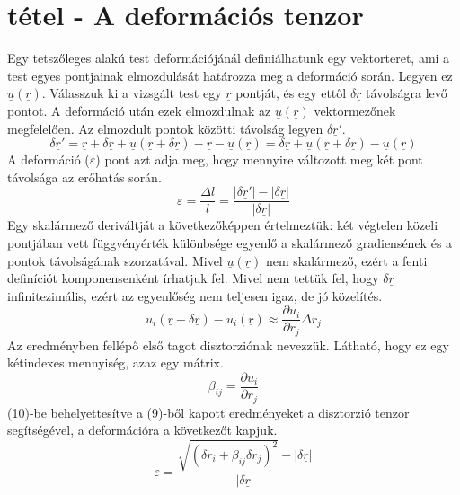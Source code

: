 \documentclass[a4paper,12pt]{article}
\begin{document}
\section{tétel - A deformációs tenzor}
Egy tetszőleges alakú test deformációjánál definiálhatunk egy vektorteret, ami a test egyes pontjainak elmozdulását határozza meg a deformáció során. Legyen ez $\underline{u}(\underline{r})$. Válasszuk ki a vizsgált test egy $\underline{r}$ pontját, és egy ettől $\delta\underline{r}$ távolságra levő pontot. A deformáció után ezek elmozdulnak az $\underline{u}(\underline{r})$ vektormezőnek megfelelően. Az elmozdult pontok közötti távolság legyen $\delta \underline{r}'$.
\begin{equation}
\delta \underline{r}'=\underline{r}+\delta\underline{r}+\underline{u}(\underline{r}+\delta\underline{r})-\underline{r}-\underline{u}(\underline{r})=\delta\underline{r}+\underline{u}(\underline{r}+\delta\underline{r})-\underline{u}(\underline{r})
\end{equation}
A deformáció ($\varepsilon$) pont azt adja meg, hogy mennyire változott meg két pont távolsága az erőhatás során.
\begin{equation}
\varepsilon=\frac{\Delta l}{l}=\frac{|\delta\underline{r}'|-|\delta\underline{r}|}{|\delta\underline{r}|}
\end{equation}
Egy skalármező deriváltját a következőképpen értelmeztük: két végtelen közeli pontjában vett függvényérték különbsége egyenlő a skalármező gradiensének és a pontok távolságának szorzatával. Mivel $\underline{u}(\underline{r})$ nem skalármező, ezért a fenti definíciót komponensenként írhatjuk fel. Mivel nem tettük fel, hogy $\delta\underline{r}$ infinitezimális, ezért az egyenlőség nem teljesen igaz, de jó közelítés.
\begin{equation}
u_i(\underline{r}+\delta\underline{r})-u_i(\underline{r})\approx\frac{\partial u_i}{\partial r_j}\Delta r_j
\end{equation}
Az eredményben fellépő első tagot disztorziónak nevezzük. Látható, hogy ez egy kétindexes mennyiség, azaz egy mátrix.
\begin{equation}
\beta_{ij}=\frac{\partial u_i}{\partial r_j}
\end{equation}
(10)-be behelyettesítve a (9)-ből kapott eredményeket a disztorzió tenzor segítségével, a deformációra a következőt kapjuk.
\begin{equation}
\varepsilon=\frac{\sqrt{(\delta r_i+\beta_{ij}\delta r_j)^2}-|\delta\underline{r}|}{|\delta\underline{r}|}
\end{equation}
\end{document}
